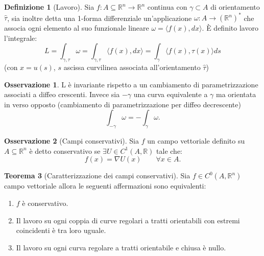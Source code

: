 \documentclass[leqno]{article}
\theoremstyle{definition}
\newtheorem{definition}{Definizione}[section]
\numberwithin{equation}{section}
\newtheorem{theorem}{Teorema}[section]
\newtheorem{observation}[theorem]{Osservazione}
\theoremstyle{remark}
\begin{document}
	\begin{definition}[Lavoro]
		Sia $f: A \subseteq \mathbb{R}^n \to \mathbb{R}^n$ continua con $\gamma \subset A$ di orientamento $\hat{\tau}$, sia inoltre detta una 1-forma differenziale un'applicazione $\omega : A \to \left(\mathbb{R}^n\right)^*$ che associa ogni elemento al suo funzionale lineare $\omega=\langle f(x), dx \rangle$. È definito lavoro l'integrale:
		\begin{equation}
			L=\int_{\gamma,\tau}\omega=\int_{\gamma,\tau}\langle f(x),dx\rangle =\int_{\gamma}\langle f(x),\tau(x)\rangle ds
		\end{equation}
		(con $x=u(s)$, $s$ ascissa curvilinea associata all'orientamento $\hat{\tau}$)
		\begin{observation}
			L è invariante rispetto a un cambiamento di parametrizzazione associati a diffeo crescenti. Invece sia $-\gamma$ una curva equivalente a $\gamma$ ma orientata in verso opposto (cambiamento di parametrizzazione per diffeo decrescente)
			\begin{equation}
				\int_{-\gamma}\omega=-\int_{\gamma}\omega.
			\end{equation}
		\end{observation}
		\begin{observation}[Campi conservativi]
			Sia $f$ un campo vettoriale definito su $A\subseteq\mathbb{R}^n$ è detto conservativo se $\exists U \in C^1(A,\mathbb{R})$ tale che:
			\begin{equation}
				f(x)=\nabla U(x) \quad \quad \forall x\in A.
			\end{equation}
			
			
			
		\end{observation}
	\end{definition}
	\begin{theorem}[Caratterizzazione dei campi conservativi]
		Sia $f\in C^0(A,\mathbb{R}^n)$ campo vettoriale allora le seguenti affermazioni sono equivalenti:
		\begin{enumerate}
			\item $f$ è conservativo.
			\item Il lavoro su ogni coppia di curve regolari a tratti orientabili con estremi coincidenti è tra loro uguale.
			\item Il lavoro su ogni curva regolare a tratti orientabile e chiusa è nullo.
		\end{enumerate}
	\end{theorem}
\end{document}

